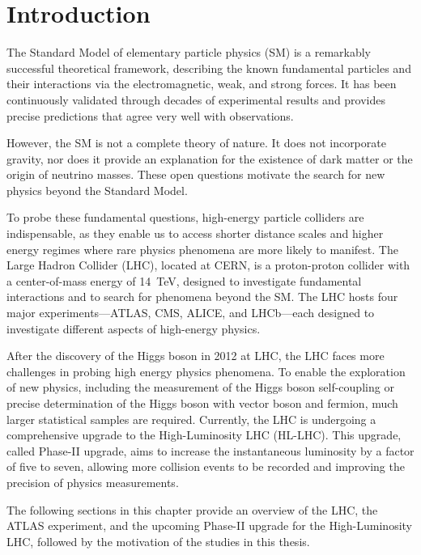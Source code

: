 \chapter{Introduction} \label{ch:introduction}
The Standard Model of elementary particle physics (SM) is a remarkably successful theoretical framework, describing the known fundamental particles and their interactions via the electromagnetic, weak, and strong forces. It has been continuously validated through decades of experimental results and provides precise predictions that agree very well with observations.

However, the SM is not a complete theory of nature. It does not incorporate gravity, nor does it provide an explanation for the existence of dark matter or the origin of neutrino masses. These open questions motivate the search for new physics beyond the Standard Model.

To probe these fundamental questions, high-energy particle colliders are indispensable, as they enable us to access shorter distance scales and higher energy regimes where rare physics phenomena are more likely to manifest. The Large Hadron Collider (LHC), located at CERN, is a proton-proton collider with a center-of-mass energy of 14~TeV, designed to investigate fundamental interactions and to search for phenomena beyond the SM. The LHC hosts four major experiments—ATLAS, CMS, ALICE, and LHCb—each designed to investigate different aspects of high-energy physics.

After the discovery of the Higgs boson in 2012 at LHC, the LHC faces more challenges in probing high energy physics phenomena. To enable the exploration of new physics, including the measurement of the Higgs boson self-coupling or precise determination of the Higgs boson with vector boson and fermion, much larger statistical samples are required. Currently, the LHC is undergoing a comprehensive upgrade to the High-Luminosity LHC (HL-LHC). This upgrade, called Phase-II upgrade, aims to increase the instantaneous luminosity by a factor of five to seven, allowing more collision events to be recorded and improving the precision of physics measurements.

The following sections in this chapter provide an overview of the LHC, the ATLAS experiment, and the upcoming Phase-II upgrade for the High-Luminosity LHC, followed by the motivation of the studies in this thesis.
